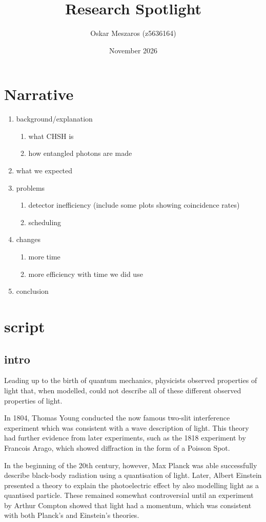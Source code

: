 \documentclass{article}
\title{Research Spotlight}
\author{Oskar Meszaros (z5636164)}
\date{November 2026}
\begin{document}
\maketitle
\section{Narrative}
\begin{enumerate}
    \item background/explanation \begin{enumerate}
        \item what CHSH is
        \item how entangled photons are made
    \end{enumerate}
    \item what we expected
    \item problems
    \begin{enumerate}
        \item detector inefficiency (include some plots showing coincidence rates)
        \item scheduling
    \end{enumerate}
    \item changes \begin{enumerate}
        \item more time
        \item more efficiency with time we did use
    \end{enumerate}
    \item conclusion
\end{enumerate}

\section{script}
\subsection{intro}
Leading up to the birth of quantum mechanics, physicists observed properties of light that, when modelled, could not describe all of these different observed properties of light.

In 1804, Thomas Young conducted the now famous two-slit interference experiment which was consistent with a wave description of light. This theory had further evidence from later experiments, such as the 1818 experiment by Francois Arago, which showed diffraction in the form of a Poisson Spot.

In the beginning of the 20th century, however, Max Planck was able successfully describe black-body radiation using a quantisation of light. Later, Albert Einstein presented a theory to explain the photoelectric effect by also modelling light as a quantised particle. These remained somewhat controversial until an experiment by Arthur Compton showed that light had a momentum, which was consistent with both Planck's and Einstein's theories.
\end{document}

